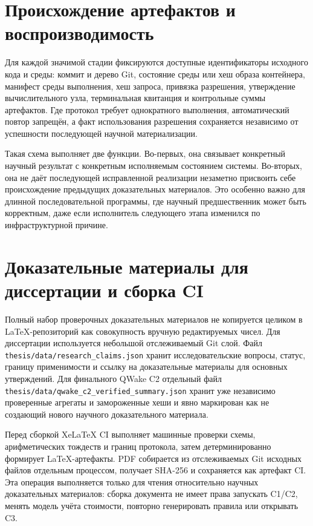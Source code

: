 \section{Происхождение артефактов и воспроизводимость}
\label{sec:method-provenance}

Для каждой значимой стадии фиксируются доступные идентификаторы исходного кода
и среды: коммит и дерево Git, состояние среды или хеш образа контейнера,
манифест среды выполнения, хеш запроса, привязка разрешения, утверждение
вычислительного узла, терминальная квитанция и контрольные суммы артефактов. Где
протокол требует однократного выполнения, автоматический повтор запрещён, а
факт использования разрешения сохраняется независимо от успешности последующей
научной материализации.

Такая схема выполняет две функции. Во-первых, она связывает конкретный научный
результат с конкретным исполняемым состоянием системы. Во-вторых, она не даёт
последующей исправленной реализации незаметно присвоить себе происхождение
предыдущих доказательных материалов. Это особенно важно для длинной
последовательной программы, где научный предшественник может быть корректным,
даже если исполнитель следующего этапа изменился по инфраструктурной причине.

\section{Доказательные материалы для диссертации и сборка CI}
\label{sec:method-thesis-ci}

Полный набор проверочных доказательных материалов не копируется целиком в
LaTeX-репозиторий как совокупность вручную редактируемых чисел. Для диссертации
используется небольшой отслеживаемый Git слой. Файл
\texttt{thesis/data/research\_claims.json} хранит исследовательские вопросы,
статус, границу применимости и ссылку на доказательные материалы для основных
утверждений. Для финального QWake C2 отдельный файл
\texttt{thesis/data/qwake\_c2\_verified\_summary.json} хранит уже независимо
проверенные агрегаты и замороженные хеши и явно маркирован как не создающий
нового научного доказательного материала.

Перед сборкой XeLaTeX CI выполняет машинные проверки схемы, арифметических
тождеств и границ протокола, затем детерминированно формирует LaTeX-артефакты.
PDF собирается из отслеживаемых Git исходных файлов отдельным процессом,
получает SHA-256 и сохраняется как артефакт CI. Эта операция выполняется только
для чтения относительно научных доказательных материалов: сборка документа не
имеет права запускать C1/C2, менять модель учёта стоимости, повторно генерировать
правила или открывать C3.

